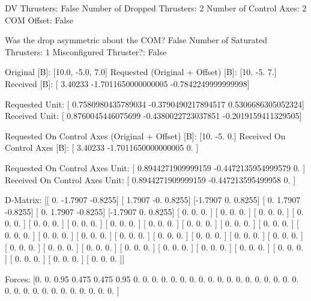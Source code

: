 DV Thrusters:	False
Number of Dropped Thrusters:	2
Number of Control Axes:	2
COM Offset:	False

Was the drop asymmetric about the COM?	False
Number of Saturated Thrusters:	1
Misconfigured Thruster?:	False

Original [B]:	[10.0, -5.0, 7.0]
Requested (Original + Offset) [B]:	[10. -5.  7.]
Received [B]:		[ 3.40233            -1.7011650000000005 -0.7842249999999998]

Requested Unit:		[ 0.7580980435789034 -0.3790490217894517  0.5306686305052324]
Received Unit:		[ 0.8760045446075699 -0.4380022723037851 -0.2019159411329505]

Requested On Control Axes (Original + Offset) [B]:	[10. -5.  0.]
Received On Control Axes [B]:		[ 3.40233            -1.7011650000000005  0.                ]

Requested On Control Axes Unit:		[ 0.8944271909999159 -0.4472135954999579  0.                ]
Received On Control Axes Unit:		[ 0.8944271909999159 -0.447213595499958   0.                ]

D-Matrix:
[[ 0.     -1.7907 -0.8255]
 [ 1.7907 -0.      0.8255]
 [-1.7907  0.      0.8255]
 [ 0.      1.7907 -0.8255]
 [ 0.      1.7907 -0.8255]
 [-1.7907  0.      0.8255]
 [ 0.      0.      0.    ]
 [ 0.      0.      0.    ]
 [ 0.      0.      0.    ]
 [ 0.      0.      0.    ]
 [ 0.      0.      0.    ]
 [ 0.      0.      0.    ]
 [ 0.      0.      0.    ]
 [ 0.      0.      0.    ]
 [ 0.      0.      0.    ]
 [ 0.      0.      0.    ]
 [ 0.      0.      0.    ]
 [ 0.      0.      0.    ]
 [ 0.      0.      0.    ]
 [ 0.      0.      0.    ]
 [ 0.      0.      0.    ]
 [ 0.      0.      0.    ]
 [ 0.      0.      0.    ]
 [ 0.      0.      0.    ]
 [ 0.      0.      0.    ]
 [ 0.      0.      0.    ]
 [ 0.      0.      0.    ]
 [ 0.      0.      0.    ]
 [ 0.      0.      0.    ]
 [ 0.      0.      0.    ]
 [ 0.      0.      0.    ]
 [ 0.      0.      0.    ]
 [ 0.      0.      0.    ]
 [ 0.      0.      0.    ]
 [ 0.      0.      0.    ]
 [ 0.      0.      0.    ]]

Forces:
[0.    0.    0.95  0.475 0.475 0.95  0.    0.    0.    0.    0.    0.
 0.    0.    0.    0.    0.    0.    0.    0.    0.    0.    0.    0.
 0.    0.    0.    0.    0.    0.    0.    0.    0.    0.    0.    0.   ]

